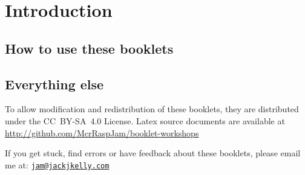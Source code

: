 \setcounter{section}{-1}
\section{Introduction}
	
		
	\subsection*{How to use these booklets}

	
	
	

	\subsection*{Everything else}
	
		\iffalse
	
		These booklets were created using \textrm{\LaTeX}, an advanced typesetting system used for several sorts of books, academic reports and letters.
			
		If you'd like to have a look at using LaTeX, We recommend looking at \TeX studio, which is available on most platforms, and also in the 	Raspbian repository.
		
		\fi
		
		To allow modification and redistribution of these booklets, they are distributed under the \hbox{CC BY-SA 4.0} License.
		Latex source documents are available at \url{http://github.com/McrRaspJam/booklet-workshops}
		
		If you get stuck, find errors or have feedback about these booklets, please email me at:
		\href{mailto:jam@jackjkelly.com}{\texttt{jam@jackjkelly.com}}
